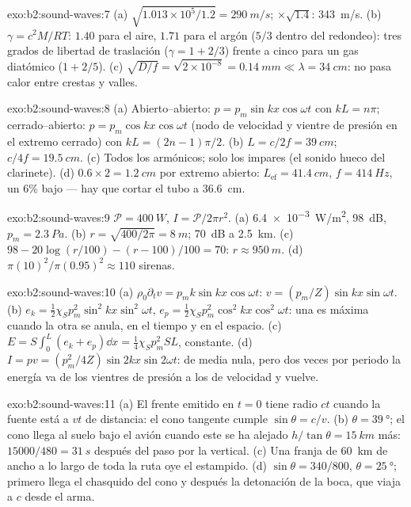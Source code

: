 \begin{solution}{exo:b2:sound-waves:7}
(a) $\sqrt{1.013 \times 10^5/1.2} = \qty{290}{m/s}$; $\times\sqrt{1.4}$: \qty{343}{m/s}. (b)
$\gamma = c^2M/RT$: $1.40$ para el aire, $1.71$ para el argón ($5/3$ dentro del redondeo):
tres grados de libertad de traslación ($\gamma = 1 + 2/3$) frente a cinco para
un gas diatómico ($1 + 2/5$). (c) $\sqrt{D/f} = \sqrt{2 \times 10^{-8}} = \qty{0.14}{mm}
\ll \lambda = \qty{34}{cm}$: no pasa calor entre crestas y valles.
\end{solution}

\begin{solution}{exo:b2:sound-waves:8}
(a) Abierto--abierto: $p = p_m\sin kx\cos\omega t$ con $kL = n\pi$; cerrado--abierto:
$p = p_m\cos kx\cos\omega t$ (nodo de velocidad y vientre de presión en el extremo
cerrado) con $kL = (2n - 1)\pi/2$. (b) $L = c/2f = \qty{39}{cm}$; $c/4f = \qty{19.5}{cm}$.
(c) Todos los armónicos; solo los impares (el sonido hueco del clarinete).
(d) $0.6 \times 2 = \qty{1.2}{cm}$ por extremo abierto: $L_{\text{ef}} = \qty{41.4}{cm}$, $f =
\qty{414}{Hz}$, un $6\%$ bajo --- hay que cortar el tubo a \qty{36.6}{cm}.
\end{solution}

\begin{solution}{exo:b2:sound-waves:9}
$\mathcal P = \qty{400}{W}$, $I = \mathcal P/2\pi r^2$. (a) \qty{6.4e-3}{W/m^2}, \qty{98}{dB},
$p_m = \qty{2.3}{Pa}$. (b) $r = \sqrt{400/2\pi} = \qty{8}{m}$; \qty{70}{dB} a \qty{2.5}{km}.
(c) $98 - 20\log(r/100) - (r - 100)/100 = 70$: $r \approx \qty{950}{m}$. (d)
$\pi(10)^2/\pi(0.95)^2 \approx 110$ sirenas.
\end{solution}

\begin{solution}{exo:b2:sound-waves:10}
(a) $\rho_0\partial_tv = p_mk\sin kx\cos\omega t$: $v = (p_m/Z)\sin kx\sin\omega t$. (b)
$e_k = \tfrac12\chi_Sp_m^2\sin^2kx\sin^2\omega t$, $e_p = \tfrac12\chi_Sp_m^2\cos^2kx\cos^2\omega t$:
una es máxima cuando la otra se anula, en el tiempo y en el espacio. (c) $E =
S\int_0^L(e_k + e_p)\dd x = \tfrac14\chi_Sp_m^2SL$, constante. (d) $I = pv =
(p_m^2/4Z)\sin2kx\sin2\omega t$: de media nula, pero dos veces por periodo la
energía va de los vientres de presión a los de velocidad y vuelve.
\end{solution}

\begin{solution}{exo:b2:sound-waves:11}
(a) El frente emitido en $t = 0$ tiene radio $ct$ cuando la fuente está a $vt$
de distancia: el cono tangente cumple $\sin\theta = c/v$. (b) $\theta = \qty{39}{\degree}$; el cono
llega al suelo bajo el avión cuando este se ha alejado $h/\tan\theta = \qty{15}{km}$
más: $15000/480 = \qty{31}{s}$ después del paso por la vertical. (c) Una franja de
\qty{60}{km} de ancho a lo largo de toda la ruta oye el estampido. (d) $\sin\theta
= 340/800$, $\theta = \qty{25}{\degree}$; primero llega el chasquido del cono y
después la detonación de la boca, que viaja a $c$ desde el arma.
\end{solution}

